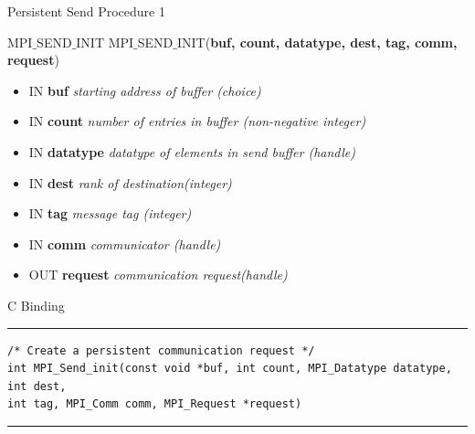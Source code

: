 \documentclass[xcolor=dvipsnames]{beamer}
\begin{document}
\begin{frame}[fragile]{Persistent Send Procedure 1}
\begin{block}{MPI$\_$SEND$\_$INIT}
MPI$\_$SEND$\_$INIT(\textbf{buf, count, datatype, dest, tag, comm, request})
\\
\begin{itemize}
\item[] IN \textbf{buf} \: \textit{starting address of buffer (choice)}\\
\item[] IN \textbf{count} \: \textit{number of entries in buffer (non-negative integer)}\\
\item[] IN \textbf{datatype} \: \textit{datatype of elements in send buffer (handle)}\\
\item[] IN \textbf{dest} \: \textit{rank of destination(integer)}\\
\item[] IN \textbf{tag} \: \textit{message tag (integer)}\\
\item[] IN \textbf{comm} \: \textit{communicator (handle)}\\
\item[] OUT \textbf{request} \: \textit{communication request(handle)}
\end{itemize}
\end{block}

C Binding
\rule{\textwidth}{1pt}
\scriptsize
\begin{verbatim}
/* Create a persistent communication request */
int MPI_Send_init(const void *buf, int count, MPI_Datatype datatype, int dest,
int tag, MPI_Comm comm, MPI_Request *request)
\end{verbatim}
\rule{\textwidth}{1pt}
\end{frame}
\end{document}

